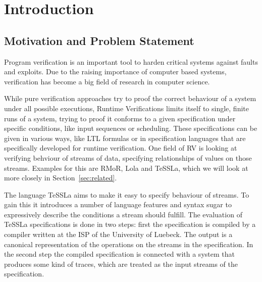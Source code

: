 %
\chapter{Introduction}
\label{sec:intro}



\section{Motivation and Problem Statement}
\label{sec:intro:motivation}

Program verification is an important tool to harden critical systems against faults and exploits.
Due to the raising importance of computer based systems, verification has become a big field of research in computer science.

While pure verification approaches try to proof the correct behaviour of a system under all possible executions,
Runtime Verifications limits itself to single, finite runs of a system, trying to proof it conforms to a given specification
under specific conditions, like input sequences or scheduling.
These specifications can be given in various ways, like LTL formulas or in specification languages that are specifically developed for
runtime verification.
One field of RV is looking at verifying behviour of streams of data, specifying relationships of values on those streams.
Examples for this are RMoR, Lola and TeSSLa, which we will look at more closely in Section~\ref{sec:related}.

The language TeSSLa aims to make it easy to specify behaviour of streams.
To gain this it introduces a number of language features and syntax sugar to expressively describe the conditions a stream should fulfill.
The evaluation of TeSSLa specifications is done in two steps: first the specification is compiled by a compiler written at the ISP of the University of Luebeck.
The output is a canonical representation of the operations on the streams in the specification.
In the second step the compiled specification is connected with a system that produces some kind of traces, which are treated as the input streams of the specification.

